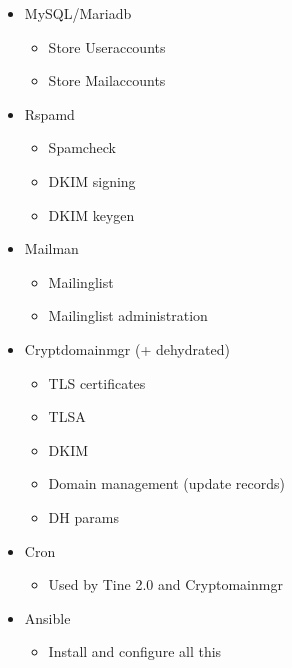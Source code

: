 \documentclass{beamer}
\begin{document}
	\begin{frame}{\insertsection}{\insertsubsection}
		\vspace{-0.5cm}
		
		\begin{itemize}
			\item MySQL/Mariadb
			\begin{itemize}
				\item Store Useraccounts
				\item Store Mailaccounts
			\end{itemize}
			\item Rspamd
			\begin{itemize}
				\item Spamcheck
				\item DKIM signing
				\item DKIM keygen
			\end{itemize}
			\item Mailman
			\begin{itemize}
				\item Mailinglist
				\item Mailinglist administration
			\end{itemize}
			\item Cryptdomainmgr (+ dehydrated)
			\begin{itemize}
				\item TLS certificates
				\item TLSA
				\item DKIM
				\item Domain management (update records)
				\item DH params
			\end{itemize}
			\item Cron
			\begin{itemize}
				\item Used by Tine 2.0 and Cryptomainmgr
			\end{itemize}
			\item Ansible
			\begin{itemize}
				\item Install and configure all this
			\end{itemize}

		\end{itemize}
	\end{frame}
	
\end{document}
